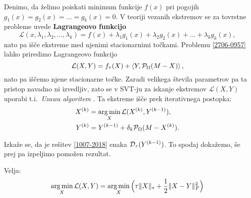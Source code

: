 Denimo, da želimo poiskati minimum funkcije $f(x)$ pri pogojih $g_1(x)=g_2(x)=\ldots=g_{k}(x)=0$.
V teoriji vezanih ekstremov se za tovrstne probleme uvede \textbf{Lagrangeovo funkcijo}
\[\mathcal{L}(x, \lambda_1,\lambda_2,\ldots,\lambda_k) = f(x) + \lambda_1 g_1(x)+\lambda_2g_2(x)+\ldots+\lambda_kg_k(x),\]
nato pa išče ekstreme med njenimi stacionarnimi točkami.
Problemu \eqref{2706-0957} lahko priredimo Lagrangeovo funkcijo
\[
    \mathcal{L}(X, Y) = f_\tau(X) + \left< Y, \mathcal{P}_\Omega(M - X) \right>,
\] 
nato pa iščemo njene stacionarne točke.
Zaradi velikega števila parametrov pa ta pristop navadno ni izvedljiv, zato se v SVT-ju za iskanje ekstremov $\mathcal{L}(X, Y)$ uporabi t.i.\ \textit{Uzawa algoritem} \cite{CCS}. Ta ekstreme išče prek iterativnega postopka:
\begin{align}
        X^{(k)} &=  \operatorname*{arg\,min}_{X} \mathcal{L}(X^{(k)}, Y^{(k-1)}) \label{1007-2018},\\
        Y^{(k)} &= Y^{(k-1)} + \delta_k \mathcal{P}_\Omega(M - X^{(k)}). \label{1007-2019}
\end{align}

Izkaže se, da je rešitev \eqref{1007-2018} enaka $\mathcal{D}_\tau(Y^{(k-1)})$. To spodaj dokažemo, še prej pa izpeljimo pomožen rezultat.

\begin{trditev}
Velja:
\begin{align}
    \operatorname*{arg\,min}_X  \mathcal{L}(X, Y)
    = \operatorname*{arg\,min}_X \Big(\tau\lVert X\rVert_* + \frac{1}{2}\lVert X - Y\rVert_F^2\Big)
\end{align}
\end{trditev}

